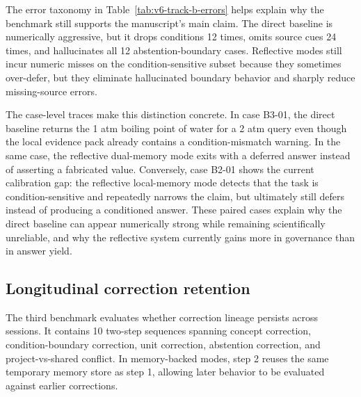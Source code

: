 \documentclass[12pt]{article}
\begin{document}
The error taxonomy in Table~\ref{tab:v6-track-b-errors} helps explain why the benchmark still supports the manuscript's main claim. The direct baseline is numerically aggressive, but it drops conditions 12 times, omits source cues 24 times, and hallucinates all 12 abstention-boundary cases. Reflective modes still incur numeric misses on the condition-sensitive subset because they sometimes over-defer, but they eliminate hallucinated boundary behavior and sharply reduce missing-source errors.

The case-level traces make this distinction concrete. In case B3-01, the direct baseline returns the 1 atm boiling point of water for a 2 atm query even though the local evidence pack already contains a condition-mismatch warning. In the same case, the reflective dual-memory mode exits with a deferred answer instead of asserting a fabricated value. Conversely, case B2-01 shows the current calibration gap: the reflective local-memory mode detects that the task is condition-sensitive and repeatedly narrows the claim, but ultimately still defers instead of producing a conditioned answer. These paired cases explain why the direct baseline can appear numerically strong while remaining scientifically unreliable, and why the reflective system currently gains more in governance than in answer yield.

\subsection{Longitudinal correction retention}

The third benchmark evaluates whether correction lineage persists across sessions. It contains 10 two-step sequences spanning concept correction, condition-boundary correction, unit correction, abstention correction, and project-vs-shared conflict. In memory-backed modes, step 2 reuses the same temporary memory store as step 1, allowing later behavior to be evaluated against earlier corrections.

\begin{table}[H]
\centering
{}
\caption{Aggregate outcomes for the longitudinal correction benchmark.}
\label{tab:v6-track-c}
\end{table}
\end{document}
